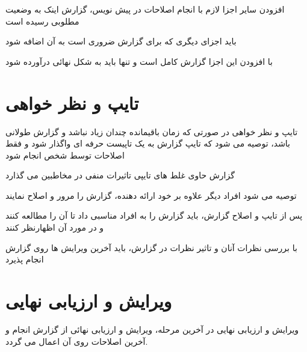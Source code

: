 \documentclass[14pt]{beamer}
\newcommand{\sectionfontsize}{\fontsize{22pt}{0pt}\selectfont}
\newcommand{\framefontsizelarge}{\fontsize{18pt}{0pt}\selectfont}
\newcommand{\frametitlefontsize}{\fontsize{20pt}{0pt}\selectfont}
\begin{document}
\begin{persian}
	\begin{frame}[plain]{\frametitlefontsize افزودن سایر اجزا لازم}
		\framefontsizelarge
		با انجام اصلاحات در پیش نویس، گزارش اینک به وضعیت مطلوبی رسیده است
		
		باید اجزای دیگری که برای گزارش ضروری است به آن اضافه شود
		
		با افزودن این اجزا گزارش کامل است و تنها باید به شکل نهائی درآورده شود
	\end{frame}	
	
	\section{\sectionfontsize تایپ و نظر خواهی}
	
	\begin{frame}[plain]{\frametitlefontsize تایپ و نظر خواهی}
		\framefontsizelarge
		در صورتی که زمان باقیمانده چندان زیاد نباشد و گزارش طولانی باشد، توصیه می شود که تایپ گزارش به یک تاپیست حرفه ای واگذار شود و فقط اصلاحات توسط شخص انجام شود
		
		گزارش حاوی غلط های تایپی تاثیرات منفی در مخاطبین می گذارد
		
		توصیه می شود افراد دیگر علاوه بر خود ارائه دهنده، گزارش را مرور و اصلاح نمایند
		
		پس از تایپ و اصلاح گزارش، باید گزارش را به افراد مناسبی داد تا آن را مطالعه کنند و در مورد آن اظهارنظر کنند
		
		با بررسی نظرات آنان و تاثیر نظرات در گزارش، باید آخرین ویرایش ها روی گزارش انجام پذیرد
	\end{frame}
	
	\section{\sectionfontsize ویرایش و ارزیابی نهایی}
	
	\begin{frame}[plain]{\frametitlefontsize ویرایش و ارزیابی نهایی}
		\framefontsizelarge
		در آخرین مرحله، ویرایش و ارزیابی نهائی از گزارش انجام و آخرین اصلاحات روی آن اعمال می گردد.
	\end{frame}

\end{persian}
\end{document}
